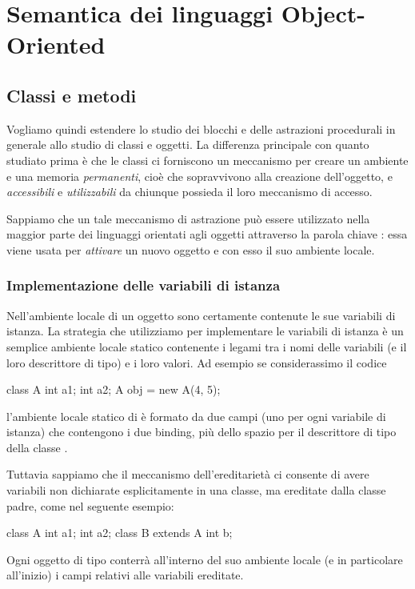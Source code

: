 \chapter{Semantica dei linguaggi Object-Oriented}

\section{Classi e metodi}

Vogliamo quindi estendere lo studio dei blocchi e delle astrazioni procedurali in generale allo studio di classi e oggetti. La differenza principale con quanto studiato prima è che le classi ci forniscono un meccanismo per creare un ambiente e una memoria \emph{permanenti}, cioè che sopravvivono alla creazione dell'oggetto, e \emph{accessibili} e \emph{utilizzabili} da chiunque possieda il loro meccanismo di accesso.

Sappiamo che un tale meccanismo di astrazione può essere utilizzato nella maggior parte dei linguaggi orientati agli oggetti attraverso la parola chiave : essa viene usata per \emph{attivare} un nuovo oggetto e con esso il suo ambiente locale.

\subsection*{Implementazione delle variabili di istanza}

Nell'ambiente locale di un oggetto sono certamente contenute le sue variabili di istanza. La strategia che utilizziamo per implementare le variabili di istanza è un semplice ambiente locale statico contenente i legami tra i nomi delle variabili (e il loro descrittore di tipo) e i loro valori. Ad esempio se considerassimo il codice \begin{Java}
    class A {
        int a1;
        int a2;
    }
    A obj = new A(4, 5);
\end{Java}
l'ambiente locale statico di  è formato da due campi (uno per ogni variabile di istanza) che contengono i due binding, più dello spazio per il descrittore di tipo della classe .

Tuttavia sappiamo che il meccanismo dell'ereditarietà ci consente di avere variabili non dichiarate esplicitamente in una classe, ma ereditate dalla classe padre, come nel seguente esempio:
\begin{Java}
    class A {
        int a1;
        int a2;
    }
    class B extends A {
        int b;
    }
\end{Java}
Ogni oggetto di tipo  conterrà all'interno del suo ambiente locale (e in particolare all'inizio) i campi relativi alle variabili ereditate.

